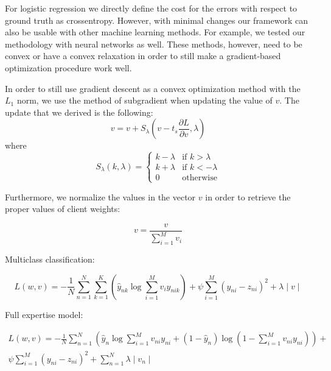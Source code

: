 \documentclass{llncs}
\begin{document}
 


For logistic regression we directly define the cost for the errors with respect to ground truth as crossentropy. However, with minimal changes our framework can also be usable with other machine learning methods. For example, we tested our methodology with neural networks as well. These methods, however, need to be convex or have a convex relaxation in order to still make a gradient-based optimization procedure work well.

In order to still use gradient descent as a convex optimization method with the $L_1$ norm, we use the method of subgradient when updating the value of $v$. The update that we derived is the following:
\begin{equation}
 v= v + S_{\lambda} (v-t_s \frac{\partial L}{\partial v}, \lambda)
\end{equation}
where
\begin{equation}
S_{\lambda} (k, \lambda) = 
\left\{
	\begin{array}{ll}
		k-\lambda  & \mbox{if } k > \lambda  \\
		k+\lambda & \mbox{if } k < -\lambda \\
		0 & \mbox{otherwise}
	\end{array}
\right.
\end{equation}

Furthermore, we normalize the values in the vector $v$ in order to retrieve the proper values of client weights:

\begin{equation}
v = \frac{v}{\sum_{i=1}^M v_i}
\end{equation}

Multiclass classification:

\begin{equation}
 L(w,v)= -\frac{1}{N} \sum_{n=1}^N \sum_{k=1}^K (\hat{y}_{nk} \log \sum_{i=1}^M v_i y_{nik}) + \psi \sum_{i=1}^{M} (y_{ni} - z_{ni})^2+\lambda \mid v \mid
\end{equation}

Full expertise model:


\begin{equation}
\begin{split}
 L(w,v)= -\frac{1}{N} \sum_{n=1}^N (\hat{y}_n \log \sum_{i=1}^M v_{ni} y_{ni} + (1-\hat{y}_n) \log(1-\sum_{i=1}^M v_{ni} y_{ni})) + \\ \psi \sum_{i=1}^{M} (y_{ni} - z_{ni})^2+\sum_{n=1}^{N}\lambda \mid v_n \mid
\end{split} 
\end{equation}
\end{document}
